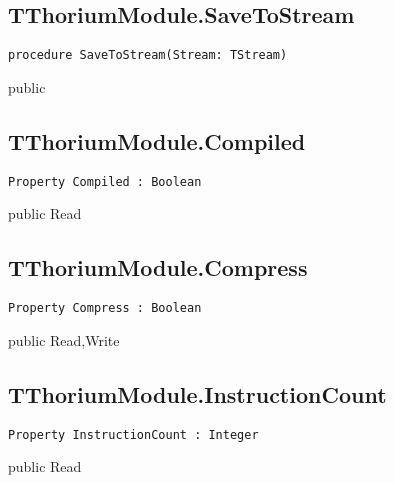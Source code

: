 \subsection{TThoriumModule.SaveToStream}
\label{thoriumcore:thorium:tthoriummodule:savetostream}
\begin{FPCList}
\Synopsis
\Declaration 

\begin{verbatim}
procedure SaveToStream(Stream: TStream)
\end{verbatim}
\Visibility
public
\Description
\Errors
\end{FPCList}
\subsection{TThoriumModule.Compiled}
\label{thoriumcore:thorium:tthoriummodule:compiled}
\begin{FPCList}
\Synopsis
\Declaration 

\begin{verbatim}
Property Compiled : Boolean
\end{verbatim}
\Visibility
public
\Access
Read
\Description
\end{FPCList}
\subsection{TThoriumModule.Compress}
\label{thoriumcore:thorium:tthoriummodule:compress}
\begin{FPCList}
\Synopsis
\Declaration 

\begin{verbatim}
Property Compress : Boolean
\end{verbatim}
\Visibility
public
\Access
Read,Write
\Description
\end{FPCList}
\subsection{TThoriumModule.InstructionCount}
\label{thoriumcore:thorium:tthoriummodule:instructioncount}
\begin{FPCList}
\Synopsis
\Declaration 

\begin{verbatim}
Property InstructionCount : Integer
\end{verbatim}
\Visibility
public
\Access
Read
\Description
\end{FPCList}
